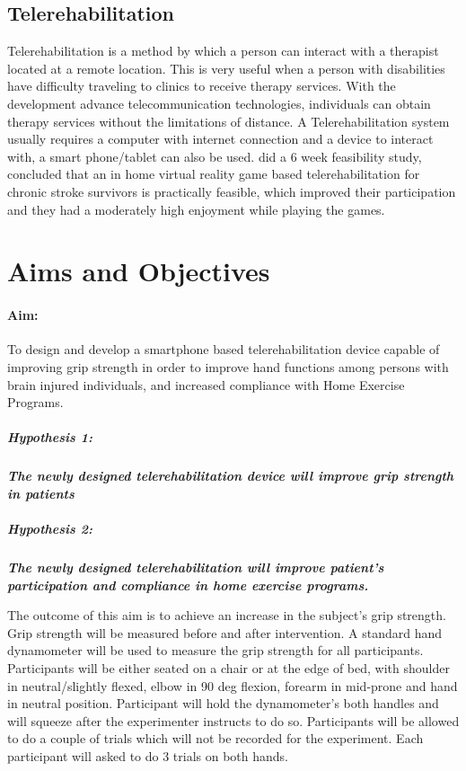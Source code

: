 \documentclass[12pt]{article}
\begin{document}
 \subsection{Telerehabilitation}
Telerehabilitation is a method by which a person can interact with a therapist   located at a remote location. This is very useful when a person with disabilities have difficulty traveling to clinics to receive therapy services. With the development advance telecommunication technologies, individuals can obtain therapy services without the limitations of distance.  A Telerehabilitation system usually requires a computer with internet connection and a device to interact with, a smart phone/tablet can also be used. \citet{proffitt2015feasibility} did a 6 week  feasibility study, concluded that an in home virtual reality game based telerehabilitation for chronic stroke survivors is practically feasible, which improved their participation and they had a moderately high enjoyment while playing the games.

 
\section {Aims and Objectives}
 \paragraph{Aim:}
 To design and develop a smartphone based telerehabilitation device capable of improving grip strength in order to improve hand functions among persons with brain injured individuals, and  increased compliance with Home Exercise Programs.
 
 \subparagraph{Hypothesis 1:}
 \textit {\textbf{The newly designed telerehabilitation device will improve grip strength in patients}} 
 
 \subparagraph{Hypothesis 2:}
 \textit{\textbf{The newly designed telerehabilitation will improve patient's participation and compliance in home exercise programs.}} 
 
 
 The outcome of this aim is to achieve an increase in the subject's grip strength. Grip strength will be measured before and after intervention. A standard hand dynamometer will be used to measure the grip strength for all participants. Participants will be either seated on a chair or at the edge of bed, with shoulder in neutral/slightly flexed, elbow in 90 deg flexion, forearm in mid-prone and hand in neutral position. Participant will hold the dynamometer's both handles and will squeeze after the experimenter instructs to do so.  Participants will be allowed to do a couple of trials which will not be recorded for the experiment. Each participant will asked to do 3 trials on both hands.
 
\end{document}
